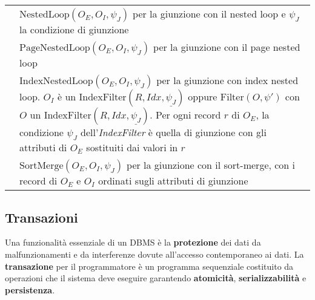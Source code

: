 \begin{table}[!h]
\begin{tabular}{|M{100pt}|M{300pt}|}
		\hline
		& $\text{NestedLoop}(O_E, O_I, \psi_J)$ \linebreak per la giunzione con il nested loop e $\psi_J$ la condizione di giunzione \\ 
		& $\text{PageNestedLoop}(O_E, O_I, \psi_J)$ \linebreak per la giunzione con il page nested loop \\ 
		 & $\text{IndexNestedLoop}(O_E, O_I, \psi_J)$ \linebreak per la giunzione con index nested loop. $O_I$ è un $\text{IndexFilter}(R, Idx, \underline{\psi_J})$ oppure $\text{Filter}(O, \psi')$ con $O$ un $\text{IndexFilter}(R, Idx, \underline{\psi_J})$. Per ogni record $r$ di $O_E$, la condizione $\psi_J$ dell'\textit{IndexFilter} è quella di giunzione con gli attributi di $O_E$ sostituiti dai valori in $r$ \\ 
		& $\text{SortMerge}(O_E, O_I, \psi_J)$ \linebreak per la giunzione con il sort-merge, con i record di $O_E$ e $O_I$ ordinati sugli attributi di giunzione \\
		\hline
	\end{tabular}
\end{table}
\egroup
\newpage
\subsection{Transazioni}
Una funzionalità essenziale di un DBMS è la \textbf{protezione} dei dati da malfunzionamenti e da interferenze dovute all’accesso contemporaneo ai dati. La \textbf{transazione} per il programmatore è un programma sequenziale costituito da operazioni che il sistema deve eseguire garantendo \textbf{atomicità}, \textbf{serializzabilità} e \textbf{persistenza}. 


